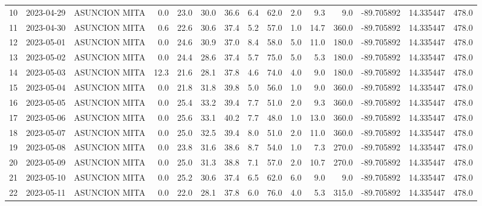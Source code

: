 \documentclass[12pt]{article}
\begin{document}
\begin{center}
\begin{tabular}{lllrrrrrrrrrrrr}
10  & 2023-04-29 &  ASUNCION MITA &     0.0 &  23.0 &   30.0 &  36.6 &      6.4 &     62.0 &  2.0 &         9.3 &         9.0 & -89.705892 &  14.335447 &    478.0 \\
11  & 2023-04-30 &  ASUNCION MITA &     0.6 &  22.6 &   30.6 &  37.4 &      5.2 &     57.0 &  1.0 &        14.7 &       360.0 & -89.705892 &  14.335447 &    478.0 \\
12  & 2023-05-01 &  ASUNCION MITA &     0.0 &  24.6 &   30.9 &  37.0 &      8.4 &     58.0 &  5.0 &        11.0 &       180.0 & -89.705892 &  14.335447 &    478.0 \\
13  & 2023-05-02 &  ASUNCION MITA &     0.0 &  24.4 &   28.6 &  37.4 &      5.7 &     75.0 &  5.0 &         5.3 &       180.0 & -89.705892 &  14.335447 &    478.0 \\
14  & 2023-05-03 &  ASUNCION MITA &    12.3 &  21.6 &   28.1 &  37.8 &      4.6 &     74.0 &  4.0 &         9.0 &       180.0 & -89.705892 &  14.335447 &    478.0 \\
15  & 2023-05-04 &  ASUNCION MITA &     0.0 &  21.8 &   31.8 &  39.8 &      5.0 &     56.0 &  1.0 &         9.0 &       360.0 & -89.705892 &  14.335447 &    478.0 \\
16  & 2023-05-05 &  ASUNCION MITA &     0.0 &  25.4 &   33.2 &  39.4 &      7.7 &     51.0 &  2.0 &         9.3 &       360.0 & -89.705892 &  14.335447 &    478.0 \\
17  & 2023-05-06 &  ASUNCION MITA &     0.0 &  25.6 &   33.1 &  40.2 &      7.7 &     48.0 &  1.0 &        13.0 &       360.0 & -89.705892 &  14.335447 &    478.0 \\
18  & 2023-05-07 &  ASUNCION MITA &     0.0 &  25.0 &   32.5 &  39.4 &      8.0 &     51.0 &  2.0 &        11.0 &       360.0 & -89.705892 &  14.335447 &    478.0 \\
19  & 2023-05-08 &  ASUNCION MITA &     0.0 &  23.8 &   31.6 &  38.6 &      8.7 &     54.0 &  1.0 &         7.3 &       270.0 & -89.705892 &  14.335447 &    478.0 \\
20  & 2023-05-09 &  ASUNCION MITA &     0.0 &  25.0 &   31.3 &  38.8 &      7.1 &     57.0 &  2.0 &        10.7 &       270.0 & -89.705892 &  14.335447 &    478.0 \\
21  & 2023-05-10 &  ASUNCION MITA &     0.0 &  25.2 &   30.6 &  37.4 &      6.5 &     62.0 &  6.0 &         9.0 &         9.0 & -89.705892 &  14.335447 &    478.0 \\
22  & 2023-05-11 &  ASUNCION MITA &     0.0 &  22.0 &   28.1 &  37.8 &      6.0 &     76.0 &  4.0 &         5.3 &       315.0 & -89.705892 &  14.335447 &    478.0 \\

\end{tabular}
\end{center}
\end{document}
